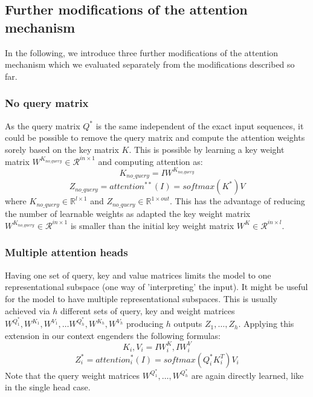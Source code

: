 \subsection{Further modifications of the attention mechanism} \label{subsec:alternative_attention}
In the following, we introduce three further modifications of the attention mechanism which we evaluated separately from the modifications described so far.



\subsubsection{No query matrix} \label{subsubsec:noquery}
As the query matrix ${Q}^*$ is the same independent of the exact input sequences, it could be possible to remove the query matrix and compute the attention weights sorely based on the key matrix $K$.
This is possible by learning a key weight matrix $W^{K_{no\_query}} \in \mathcal{R}^{in \times 1}$ and computing attention as:
$$K_{no\_query} = IW^{K_{no\_query}}$$
$$Z_{no\_query} = {attention}^{**}(I) = softmax(K^*)V$$
where $K_{no\_query} \in \mathbb{R}^{l \times 1}$ and $Z_{no\_query} \in \mathbb{R}^{1 \times out}$. This has the advantage of reducing the number of learnable weights as adapted the key weight matrix $W^{K_{no\_query}} \in \mathcal{R}^{in \times 1}$ is smaller than the initial key weight matrix $W^{K} \in \mathcal{R}^{in \times l}$.  


\subsubsection{Multiple attention heads} \label{subsubsec:heads}
Having one set of query, key and value matrices limits the model to one representational subspace (one way of 'interpreting' the input). It might be useful for the model to have multiple representational subspaces. This is usually achieved \cite{allyouneed} via $h$ different sets of query, key and weight matrices $W^{Q^*_1}, W^{K_1}, W^{V_1}, \dots W^{Q^*_{h}}, W^{K_{h}},W^{V_{h}}$ producing $h$  outputs $Z_1, \dots, Z_{h}$. Applying this extension in our context engenders the following formulas:
$$K_i, V_i = IW^K_i, IW^V_i$$
$$Z^*_i = {attention}^*_i(I) = softmax({Q}^*_iK^T_i)V_i$$
Note that the query weight matrices $W^{Q^*_1}, \dots, W^{Q^*_h}$ are again directly learned, like in the single head case. 

